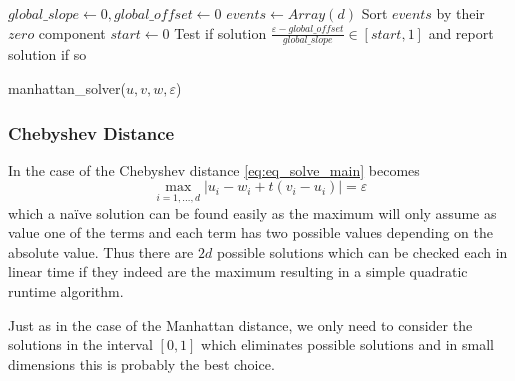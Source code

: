 \begin{algorithm}[ht]
  \DontPrintSemicolon
  \BlankLine
  \(global\_slope \gets 0, global\_offset \gets 0\) \;
  \(events \gets Array(d)\)
  Sort \(events\) by their \(zero\) component\;
  \(start \gets 0\)\;
  Test if solution \(\frac{\varepsilon - global\_offset}{global\_slope} \in [start, 1]\) and report solution if so\;

  \caption{manhattan\_solver(\(u, v, w, \varepsilon\))}
  \label{algo:solve_manhattan}
\end{algorithm}


\subsubsection{Chebyshev Distance}
\label{subsubsec:eq_chebyshev_distance}
In the case of the Chebyshev distance \cref{eq:eq_solve_main} becomes 
\begin{equation}
  \max_{i = 1,\dots, d} |u_i - w_i + t(v_i - u_i)| = \varepsilon\label{eq:solve_chebyshev}
\end{equation}
which a na\"ive solution can be found easily as the maximum will only assume as value one of the terms and each term has two possible values depending on the absolute value. Thus there are \(2d\) possible solutions which can be checked each in linear time if they indeed are the maximum resulting in a simple quadratic runtime algorithm. 

Just as in the case of the Manhattan distance, we only need to consider the solutions in the interval \([0,1]\) which eliminates possible solutions and in small dimensions this is probably the best choice. 

